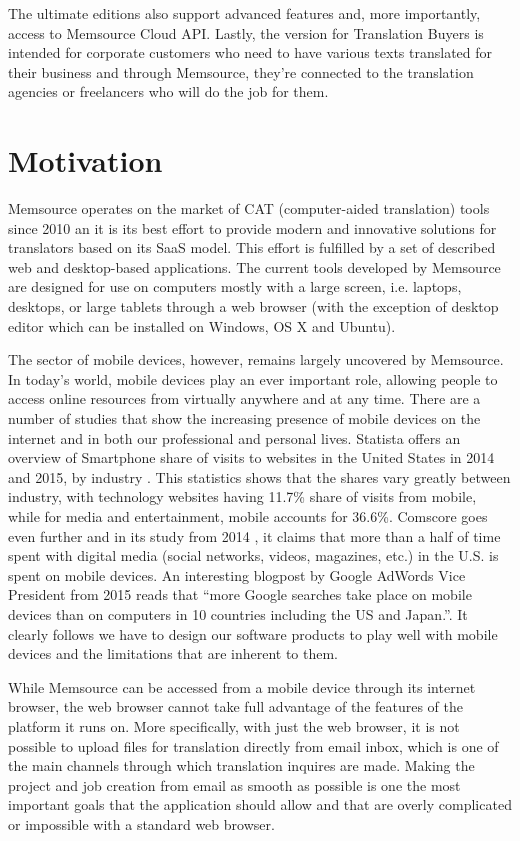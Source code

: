 The ultimate editions also support advanced features and, more importantly, access to Memsource Cloud API. Lastly, the version for Translation Buyers is intended for corporate customers who need to have various texts translated for their business and through Memsource, they're connected to the translation agencies or freelancers who will do the job for them. 


\section{Motivation}

Memsource operates on the market of CAT (computer-aided translation) tools since 2010 an it is its best effort to provide modern and innovative solutions for translators based on its SaaS model. This effort is fulfilled by a set of described web and desktop-based applications. The current tools developed by Memsource are designed for use on computers mostly with a large screen, i.e. laptops, desktops, or large tablets through a web browser (with the exception of desktop editor which can be installed on Windows, OS X and Ubuntu).

The sector of mobile devices, however, remains largely uncovered by Memsource. In today's world, mobile devices play an ever important role, allowing people to access online resources from virtually anywhere and at any time. There are a number of studies that show the increasing presence of mobile devices on the internet and in both our professional and personal lives. 
Statista  offers an overview of Smartphone share of visits to websites in the United States in 2014 and 2015, by industry \cite{statista}. This statistics shows that the shares vary greatly between industry, with technology websites having 11.7\% share of visits from mobile, while for media and entertainment, mobile accounts for 36.6\%. Comscore goes even further and in its study from 2014 \cite{comscore}, it claims that more than a half of time spent with digital media (social networks, videos, magazines, etc.) in the U.S. is spent on mobile devices. An interesting blogpost by Google AdWords Vice President from 2015 \cite{googleAdwords} reads that ``more Google searches take place on mobile devices than on computers in 10 countries including the US and Japan.''. It clearly follows we have to design our software products to play well with mobile devices and the limitations that are inherent to them. 

While Memsource can be accessed from a mobile device through its internet browser, the web browser cannot take full advantage of the features of the platform it runs on. More specifically, with just the web browser, it is not possible to upload files for translation directly from email inbox, which is one of the main channels through which translation inquires are made. Making the project and job creation from email as smooth as possible is one the most important goals that the application should allow and that are overly complicated or impossible with a standard web browser.

